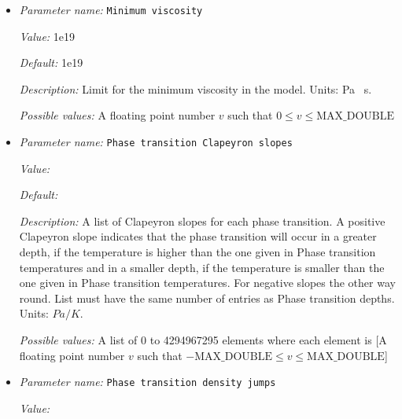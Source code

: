 \begin{itemize}
{\it Value:} 1e24


{\it Default:} 1e24


{\it Description:} Limit for the maximum viscosity in the model. Units: Pa \, s.


{\it Possible values:} A floating point number $v$ such that $0 \leq v \leq \text{MAX\_DOUBLE}$
\item {\it Parameter name:} {\tt Minimum viscosity}
\label{parameters:Material model/Latent heat/Minimum viscosity}


{\it Value:} 1e19


{\it Default:} 1e19


{\it Description:} Limit for the minimum viscosity in the model. Units: Pa \, s.


{\it Possible values:} A floating point number $v$ such that $0 \leq v \leq \text{MAX\_DOUBLE}$
\item {\it Parameter name:} {\tt Phase transition Clapeyron slopes}
\label{parameters:Material model/Latent heat/Phase transition Clapeyron slopes}


{\it Value:} 


{\it Default:} 


{\it Description:} A list of Clapeyron slopes for each phase transition. A positive Clapeyron slope indicates that the phase transition will occur in a greater depth, if the temperature is higher than the one given in Phase transition temperatures and in a smaller depth, if the temperature is smaller than the one given in Phase transition temperatures. For negative slopes the other way round. List must have the same number of entries as Phase transition depths. Units: $Pa/K$.


{\it Possible values:} A list of 0 to 4294967295 elements where each element is [A floating point number $v$ such that $-\text{MAX\_DOUBLE} \leq v \leq \text{MAX\_DOUBLE}$]
\item {\it Parameter name:} {\tt Phase transition density jumps}
\label{parameters:Material model/Latent heat/Phase transition density jumps}


{\it Value:} 



\end{itemize}
